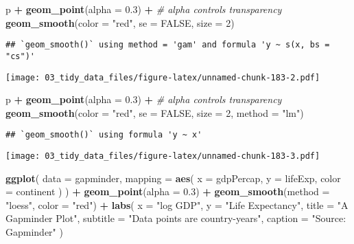\documentclass[
]{book}
\newenvironment{Shaded}{\begin{snugshade}}{\end{snugshade}}
\newcommand{\CommentTok}[1]{\textcolor[rgb]{0.56,0.35,0.01}{\textit{#1}}}
\newcommand{\DataTypeTok}[1]{\textcolor[rgb]{0.13,0.29,0.53}{#1}}
\newcommand{\DecValTok}[1]{\textcolor[rgb]{0.00,0.00,0.81}{#1}}
\newcommand{\FloatTok}[1]{\textcolor[rgb]{0.00,0.00,0.81}{#1}}
\newcommand{\KeywordTok}[1]{\textcolor[rgb]{0.13,0.29,0.53}{\textbf{#1}}}
\newcommand{\NormalTok}[1]{#1}
\newcommand{\OperatorTok}[1]{\textcolor[rgb]{0.81,0.36,0.00}{\textbf{#1}}}
\newcommand{\OtherTok}[1]{\textcolor[rgb]{0.56,0.35,0.01}{#1}}
\newcommand{\StringTok}[1]{\textcolor[rgb]{0.31,0.60,0.02}{#1}}
\begin{document}
\begin{Shaded}
\begin{Highlighting}[]
\NormalTok{p }\OperatorTok{+}\StringTok{ }\KeywordTok{geom\_point}\NormalTok{(}\DataTypeTok{alpha =} \FloatTok{0.3}\NormalTok{) }\OperatorTok{+}\StringTok{ }\CommentTok{\# alpha controls transparency}
\StringTok{  }\KeywordTok{geom\_smooth}\NormalTok{(}\DataTypeTok{color =} \StringTok{"red"}\NormalTok{, }\DataTypeTok{se =} \OtherTok{FALSE}\NormalTok{, }\DataTypeTok{size =} \DecValTok{2}\NormalTok{)}
\end{Highlighting}
\end{Shaded}

\begin{verbatim}
## `geom_smooth()` using method = 'gam' and formula 'y ~ s(x, bs = "cs")'
\end{verbatim}

\texttt{[image: 03\_tidy\_data\_files/figure-latex/unnamed-chunk-183-2.pdf]}

\begin{Shaded}
\begin{Highlighting}[]
\NormalTok{p }\OperatorTok{+}\StringTok{ }\KeywordTok{geom\_point}\NormalTok{(}\DataTypeTok{alpha =} \FloatTok{0.3}\NormalTok{) }\OperatorTok{+}\StringTok{ }\CommentTok{\# alpha controls transparency}
\StringTok{  }\KeywordTok{geom\_smooth}\NormalTok{(}\DataTypeTok{color =} \StringTok{"red"}\NormalTok{, }\DataTypeTok{se =} \OtherTok{FALSE}\NormalTok{, }\DataTypeTok{size =} \DecValTok{2}\NormalTok{, }\DataTypeTok{method =} \StringTok{"lm"}\NormalTok{)}
\end{Highlighting}
\end{Shaded}

\begin{verbatim}
## `geom_smooth()` using formula 'y ~ x'
\end{verbatim}

\texttt{[image: 03\_tidy\_data\_files/figure-latex/unnamed-chunk-183-3.pdf]}

\begin{Shaded}
\begin{Highlighting}[]
\KeywordTok{ggplot}\NormalTok{(}
  \DataTypeTok{data =}\NormalTok{ gapminder,}
  \DataTypeTok{mapping =} \KeywordTok{aes}\NormalTok{(}
    \DataTypeTok{x =}\NormalTok{ gdpPercap, }\DataTypeTok{y =}\NormalTok{ lifeExp,}
    \DataTypeTok{color =}\NormalTok{ continent}
\NormalTok{  )}
\NormalTok{) }\OperatorTok{+}
\StringTok{  }\KeywordTok{geom\_point}\NormalTok{(}\DataTypeTok{alpha =} \FloatTok{0.3}\NormalTok{) }\OperatorTok{+}
\StringTok{  }\KeywordTok{geom\_smooth}\NormalTok{(}\DataTypeTok{method =} \StringTok{"loess"}\NormalTok{, }\DataTypeTok{color =} \StringTok{"red"}\NormalTok{) }\OperatorTok{+}
\StringTok{  }\KeywordTok{labs}\NormalTok{(}
    \DataTypeTok{x =} \StringTok{"log GDP"}\NormalTok{,}
    \DataTypeTok{y =} \StringTok{"Life Expectancy"}\NormalTok{,}
    \DataTypeTok{title =} \StringTok{"A Gapminder Plot"}\NormalTok{,}
    \DataTypeTok{subtitle =} \StringTok{"Data points are country{-}years"}\NormalTok{,}
    \DataTypeTok{caption =} \StringTok{"Source: Gapminder"}
\NormalTok{  )}
\end{Highlighting}
\end{Shaded}
\end{document}
